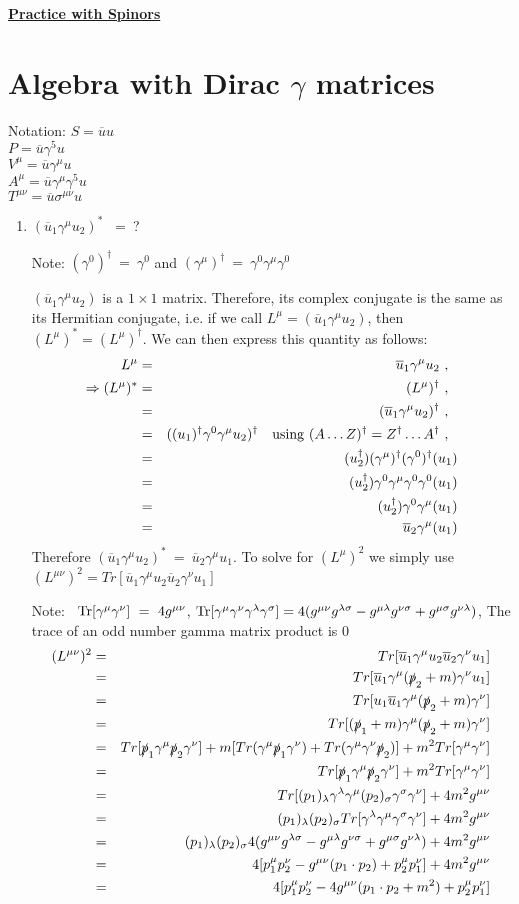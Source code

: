\documentclass[12pt]{article}
\def \bea{\begin{eqnarray}}
\def \eea{\end{eqnarray}}
\def \Tr{{\rm Tr}}
\def \nn{ }
\def \nl{\nn \\}
\def \ou{\overline{u}}
\def \ga{\gamma}
\def \la{\lambda}
\def \si{\sigma}
\begin{document}
\begin{center}
\underline{\textbf{\Large Practice with Spinors}}
\end{center}

\section{Algebra with Dirac $\ga$ matrices}

\item Notation: $S= \ou u$\nl
$P=\ou \ga^5 u$ \nl 
$V^\mu = \ou \ga^\mu u$ \nl 
$A^\mu = \ou \ga^\mu \ga^5 u $ \nl 
$T^{\mu\nu} = \ou \si^{\mu\nu} u$

\begin{enumerate}

\item$(\ou_1\ga^\mu u_2)^*$ ~=~?

Note: $(\ga^0)^\dag~=~\ga^0$ and $(\ga^\mu)^\dag~=~ \ga^0\ga^\mu\ga^0$

$(\ou_1\ga^\mu u_2)$ is a $1\times1$ matrix. Therefore, its complex conjugate is the same as its Hermitian conjugate, i.e. if we call
$L^\mu = (\ou_1\ga^\mu u_2)$, then $(L^\mu)^* = (L^\mu)^\dag$. We can then express this quantity as follows:
\bea
L^\mu &=& \ou_1\ga^\mu u_2 ~,~~ \\\nonumber
\Rightarrow (L^\mu)^* &=& (L^\mu)^\dag ~,~~ \nl \nonumber
&=& (\ou_1\ga^\mu u_2)^\dag ~,~~ \nl \nonumber
&=& ((u_1)^\dag\ga^0\ga^\mu u_2)^\dag ~~~{\rm using}~(A\ldots Z)^\dag = Z^\dag\ldots A^\dag ~,~~ \nl \nonumber
&=& (u_2^\dag)(\ga^\mu)^\dag(\ga^0)^\dag(u_1)\nl \nonumber
&=& (u_2^\dag)\ga^0\ga^\mu\ga^0\ga^0(u_1)\nl\nonumber
&=& (u_2^\dag)\ga^0\ga^\mu(u_1)\nl
&=& \ou_2\ga^\mu(u_1) 
\eea
Therefore $(\ou_1\ga^\mu u_2)^*~=~\ou_2\ga^\mu u_1 $. To solve for $(L^\mu)^2$ we simply use $(L^{\mu\nu})^2 = Tr[\ou_1 \ga^\mu u_2 \ou_2 \ga^\nu u_1]$

Note: ~$\Tr[\ga^\mu\ga^\nu]~=~4 g^{\mu\nu}$, $\Tr[\ga^\mu \ga^\nu \ga^\la \ga^\si]= 4(g^{\mu\nu}g^{\la\si} - g^{\mu\la} g^{\nu\si} + g^{\mu\si}g^{\nu\la})$, The trace of an odd number gamma matrix product is 0 
\bea
(L^{\mu\nu})^2 &=& Tr[\ou_1 \ga^\mu u_2 \ou_2 \ga^\nu u_1] \\\nonumber
&=& Tr[\ou_1 \ga^\mu (\slashed{p}_2+m) \ga^\nu u_1]\nl\nonumber
&=& Tr[u_1\ou_1 \ga^\mu (\slashed{p}_2+m) \ga^\nu]\nl\nonumber
&=& Tr[(\slashed{p}_1+m) \ga^\mu (\slashed{p}_2+m) \ga^\nu]\nl\nonumber
&=& Tr[\slashed{p}_1\ga^\mu \slashed{p}_2 \ga^\nu] + m[Tr(\ga^\mu \slashed{p}_1\ga^\nu) + Tr(\ga^\mu \ga^\nu \slashed{p}_2)] + m^2Tr[\ga^\mu \ga^\nu]\nl\nonumber
&=& Tr[\slashed{p}_1\ga^\mu \slashed{p}_2 \ga^\nu] + m^2Tr[\ga^\mu \ga^\nu]\nl\nonumber
&=& Tr[(p_1)_\la\ga^\la \ga^\mu (p_2)_\si\ga^\si \ga^\nu  ] + 4m^2g^{\mu\nu}\nl\nonumber
&=& (p_1)_\la (p_2)_\si Tr[\ga^\la \ga^\mu\ga^\si \ga^\nu  ] + 4m^2g^{\mu\nu}\nl\nonumber
&=& (p_1)_\la(p_2)_\si 4(g^{\mu\nu}g^{\la\si} - g^{\mu\la} g^{\nu\si} + g^{\mu\si}g^{\nu\la}) + 4m^2g^{\mu\nu}\nl\nonumber
&=& 4[p_1^\mu p_2^\nu - g^{\mu\nu}(p_1 \cdot p_2) + p_2^\mu p_1^\nu] + 4m^2g^{\mu\nu} \nl
&=& 4[p_1^\mu p_2^\nu - 4g^{\mu\nu}(p_1 \cdot p_2 + m^2) + p_2^\mu p_1^\nu]
\eea


\end{enumerate}
\end{document}
